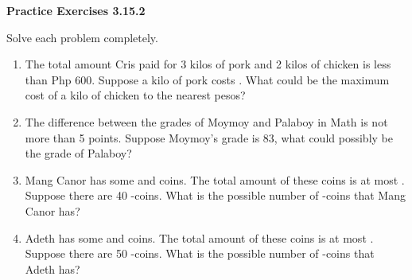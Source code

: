  \vspace{1ex}
\noindent\textbf{Practice Exercises 3.15.2}

\vspace{0.75ex}

Solve each problem completely.

\begin{enumerate}%
   \item The total amount Cris paid for 3 kilos of pork and 2 kilos of chicken is less than Php 600. Suppose a kilo of pork costs . What could be the maximum cost of a kilo of chicken to the nearest pesos?

   \item The difference between the grades of Moymoy and Palaboy in Math is not more than 5 points. Suppose Moymoy's grade is 83, what could possibly be the grade of Palaboy?
   \item Mang Canor has some  and  coins. The total amount of these coins is at most . Suppose there are 40 -coins. What is the possible number of -coins that Mang Canor has?
   \item Adeth has some  and  coins. The total amount of these coins is at most . Suppose there are 50 -coins. What is the possible number of -coins that Adeth has?
\end{enumerate}
